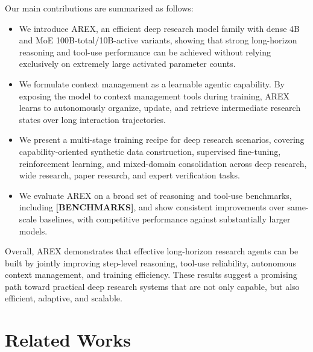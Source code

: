 \documentclass[]{selfevolagent}
\theoremstyle{plain}
\theoremstyle{definition}
\theoremstyle{remark}
\begin{document}
Our main contributions are summarized as follows:
\begin{itemize}
\item We introduce \textsc{AREX}, an efficient deep research model family with dense 4B and MoE 100B-total/10B-active variants, showing that strong long-horizon reasoning and tool-use performance can be achieved without relying exclusively on extremely large activated parameter counts.
\item We formulate context management as a learnable agentic capability. By exposing the model to context management tools during training, \textsc{AREX} learns to autonomously organize, update, and retrieve intermediate research states over long interaction trajectories.
\item We present a multi-stage training recipe for deep research scenarios, covering capability-oriented synthetic data construction, supervised fine-tuning, reinforcement learning, and mixed-domain consolidation across deep research, wide research, paper research, and expert verification tasks.
\item We evaluate \textsc{AREX} on a broad set of reasoning and tool-use benchmarks, including \textbf{[BENCHMARKS]}, and show consistent improvements over same-scale baselines, with competitive performance against substantially larger models.
\end{itemize}

Overall, \textsc{AREX} demonstrates that effective long-horizon research agents can be built by jointly improving step-level reasoning, tool-use reliability, autonomous context management, and training efficiency. These results suggest a promising path toward practical deep research systems that are not only capable, but also efficient, adaptive, and scalable.


\section{Related Works}
\end{document}
